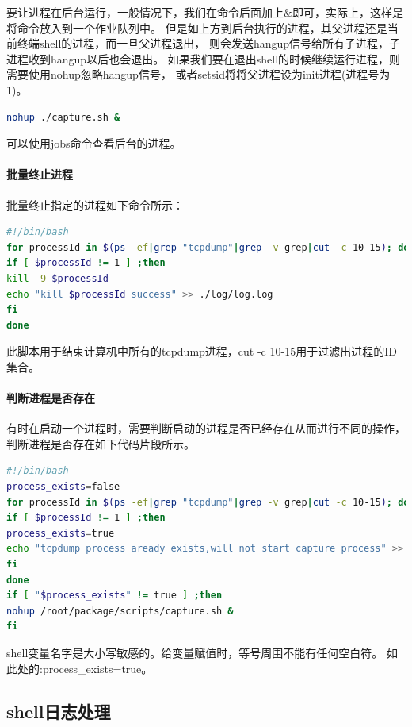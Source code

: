 \documentclass{book}
\begin{document}
要让进程在后台运行，一般情况下，我们在命令后面加上\&即可，实际上，这样是将命令放入到一个作业队列中。
但是如上方到后台执行的进程，其父进程还是当前终端shell的进程，而一旦父进程退出，
则会发送hangup信号给所有子进程，子进程收到hangup以后也会退出。
如果我们要在退出shell的时候继续运行进程，则需要使用nohup忽略hangup信号，
或者setsid将将父进程设为init进程(进程号为1)。

\begin{lstlisting}[language=Bash]
nohup ./capture.sh &
\end{lstlisting}

可以使用jobs命令查看后台的进程。

\paragraph{批量终止进程}批量终止指定的进程如下命令所示：

\begin{lstlisting}[language=Bash]
#!/bin/bash
for processId in $(ps -ef|grep "tcpdump"|grep -v grep|cut -c 10-15); do	
if [ $processId != 1 ] ;then
kill -9 $processId
echo "kill $processId success" >> ./log/log.log
fi
done
\end{lstlisting}

此脚本用于结束计算机中所有的tcpdump进程，cut -c 10-15用于过滤出进程的ID集合。

\paragraph{判断进程是否存在}

有时在启动一个进程时，需要判断启动的进程是否已经存在从而进行不同的操作，
判断进程是否存在如下代码片段所示。

\begin{lstlisting}[language=Bash]
#!/bin/bash
process_exists=false
for processId in $(ps -ef|grep "tcpdump"|grep -v grep|cut -c 10-15); do
if [ $processId != 1 ] ;then
process_exists=true
echo "tcpdump process aready exists,will not start capture process" >> ./log/capture.log
fi
done
if [ "$process_exists" != true ] ;then
nohup /root/package/scripts/capture.sh &
fi
\end{lstlisting}

shell变量名字是大小写敏感的。给变量赋值时，等号周围不能有任何空白符。
如此处的:process\_exists=true。

\subsection{shell日志处理}
\end{document}
